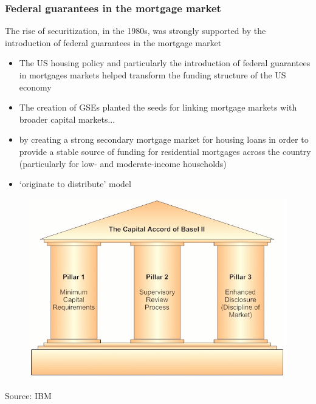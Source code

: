\documentclass[11pt]{beamer}
\begin{document}

\begin{frame}
\frametitle{Federal guarantees in the mortgage market}
The rise of securitization, in the 1980s, was strongly supported by the introduction of federal guarantees in the mortgage market
\begin{itemize}
\item The US housing policy and particularly the introduction of
federal guarantees in mortgages markets helped transform
the funding structure of the US economy
\item The creation of GSEs planted the seeds for linking mortgage markets with broader capital markets...
\item by creating a strong secondary mortgage market for housing loans in order to  provide a stable source of funding for residential mortgages across the country (particularly for low- and moderate-income households)
\item  ‘originate to distribute’ model
\end{itemize}
\end{frame}


\begin{frame}
\begin{figure}
\includegraphics[width=1 \textwidth]{Figures/BaselII.png}
\end{figure}
\tiny{Source: IBM}
\end{frame}

\end{document}
